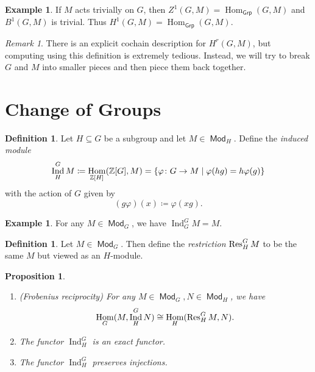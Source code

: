 \documentclass[leqno, openany]{memoir}
\newtheorem{prop}[thm]{Proposition}
\theoremstyle{definition}
\newtheorem{defn}[thm]{Definition}
\newtheorem{exm}[thm]{Example}
\theoremstyle{remark}
\newtheorem{rmk}[thm]{Remark}
\theoremstyle{plain}
\theoremstyle{definition}
\theoremstyle{remark}
\newcommand{\Z}{\mathbb{Z}}
\newcommand{\ms}[1]{\mathsf{#1}}
\DeclareMathOperator{\Hom}{Hom}
\DeclareMathOperator{\Mod}{\mathsf{Mod}}
\DeclareMathOperator{\Ind}{Ind}
\begin{document}
\begin{exm} If $M$ acts trivially on $G$, then $Z^1(G, M) = \Hom_{\ms{Grp}}(G,
M)$ and $B^1(G, M)$ is trivial. Thus $H^1(G, M) = \Hom_{\ms{Grp}}(G, M)$.
\end{exm}

\begin{rmk} There is an explicit cochain description for $H^r(G, M)$, but
computing using this definition is extremely tedious. Instead, we will try to
break $G$ and $M$ into smaller pieces and then piece them back together.
\end{rmk}

\section{Change of Groups}%

\begin{defn} Let $H \subseteq G$ be a subgroup and let $M \in \Mod_H$. Define
    the \textit{induced module} \[ \Ind_H^G M \coloneqq \Hom_{\Z[H]} (\Z[G], M)
    = \qty{\varphi \colon G \to M \mid \varphi(hg) = h \varphi(g)} \] with the
    action of $G$ given by \[ (g \varphi)(x) \coloneqq \varphi(xg). \]
\end{defn}

\begin{exm} For any $M \in \Mod_G$, we have $\Ind_G^G M = M$.  \end{exm}

\begin{defn} Let $M \in \Mod_G$. Then define the \textit{restriction} $\Res_H^G
M$ to be the same $M$ but viewed as an $H$-module.  \end{defn}

\begin{prop}\leavevmode \begin{enumerate} \item (Frobenius reciprocity) For any
    $M \in \Mod_G, N \in \Mod_H$, we have \[ \Hom_G(M, \Ind_H^G N) \cong
    \Hom_H(\Res_H^G M, N). \] \item The functor $\Ind_H^G$ is an exact functor.
\item The functor $\Ind_H^G$ preserves injections.  \end{enumerate} \end{prop}
\end{document}
